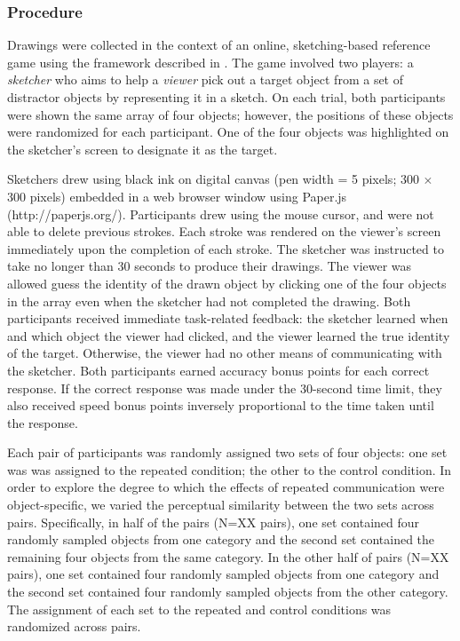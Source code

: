 \documentclass[10pt,letterpaper]{article}
\begin{document}
\subsubsection{Procedure} 

Drawings were collected in the context of an online, sketching-based reference game using the framework described in . 
The game involved two players: a \textit{sketcher} who aims to help a \textit{viewer} pick out a target object from a set of distractor objects by representing it in a sketch. 
On each trial, both participants were shown the same array of four objects; however, the positions of these objects were randomized for each participant. 
One of the four objects was highlighted on the sketcher's screen to designate it as the target.

Sketchers drew using black ink on digital canvas (pen width = 5 pixels; 300 $\times$ 300 pixels) embedded in a web browser window using Paper.js (http://paperjs.org/). 
Participants drew using the mouse cursor, and were not able to delete previous strokes. Each stroke was rendered on the viewer's screen immediately upon the completion of each stroke. 
The sketcher was instructed to take no longer than 30 seconds to produce their drawings. 
The viewer was allowed guess the identity of the drawn object by clicking one of the four objects in the array even when the sketcher had not completed the drawing. 
Both participants received immediate task-related feedback: the sketcher learned when and which object the viewer had clicked, and the viewer learned the true identity of the target. 
Otherwise, the viewer had no other means of communicating with the sketcher. 
Both participants earned accuracy bonus points for each correct response. 
If the correct response was made under the 30-second time limit, they also received speed bonus points inversely proportional to the time taken until the response.



Each pair of participants was randomly assigned two sets of four objects: one set was was assigned to the repeated condition; the other to the control condition.
In order to explore the degree to which the effects of repeated communication were object-specific, we varied the perceptual similarity between the two sets across pairs. 
Specifically, in half of the pairs (N=XX pairs), one set contained four randomly sampled objects from one category and the second set contained the remaining four objects from the same category. 
In the other half of pairs (N=XX pairs), one set contained four randomly sampled objects from one category and the second set contained four randomly sampled objects from the other category.
The assignment of each set to the repeated and control conditions was randomized across pairs. 
\end{document}

